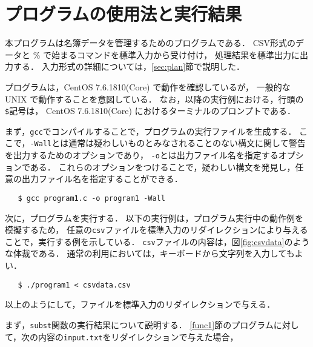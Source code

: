 \section{プログラムの使用法と実行結果}\label{sec:howresult}

本プログラムは名簿データを管理するためのプログラムである．
CSV形式のデータと \% で始まるコマンドを標準入力から受け付け，
処理結果を標準出力に出力する．
入力形式の詳細については，\ref{sec:plan}節で説明した．

プログラムは，CentOS 7.6.1810(Core) で動作を確認しているが，
一般的な UNIX で動作することを意図している．
なお，以降の実行例における，行頭の\verb|$|記号は，
CentOS 7.6.1810(Core) におけるターミナルのプロンプトである．

まず，\verb|gcc|でコンパイルすることで，プログラムの実行ファイルを生成する．
ここで，\verb|-Wall|とは通常は疑わしいものとみなされることのない構文に関して警告を出力するためのオプションであり，
\verb|-o|とは出力ファイル名を指定するオプションである．
これらのオプションをつけることで，疑わしい構文を発見し，任意の出力ファイル名を指定することができる．

{\fontsize{10pt}{11pt} \selectfont
 \begin{verbatim}
   $ gcc program1.c -o program1 -Wall
 \end{verbatim}
}

次に，プログラムを実行する．
以下の実行例は，プログラム実行中の動作例を模擬するため，
任意の\verb|csv|ファイルを標準入力のリダイレクションにより与えることで，実行する例を示している\cite{www:label1}．
\verb|csv|ファイルの内容は，図\ref{fig:csvdata}のような体裁である．
通常の利用においては，キーボードから文字列を入力してもよい．

{\fontsize{10pt}{11pt} \selectfont
 \begin{verbatim}
   $ ./program1 < csvdata.csv
 \end{verbatim}
}

以上のようにして，ファイルを標準入力のリダイレクションで与える．

まず，\verb|subst|関数の実行結果について説明する．
\ref{func1}節のプログラムに対して，次の内容の\verb|input.txt|をリダイレクションで与えた場合，

